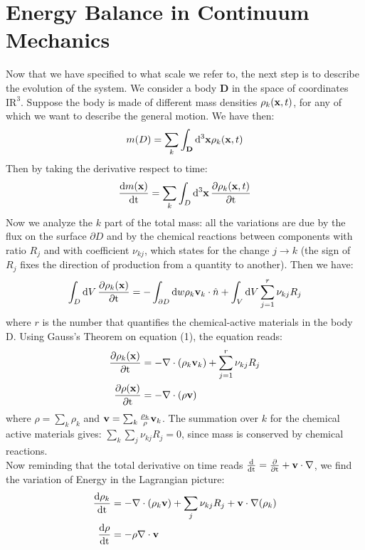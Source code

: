 \documentclass{article}
\newcommand*\diff{\mathop{}\!\mathrm{d}}
\newcommand*\Diff[1]{\mathop{}\!\mathrm{d^#1}}
\newcommand*\Tder[1]{\mathop{}\!\frac{\diff #1}{\diff \mathrm{t}}}
\newcommand*\tder[1]{\mathop{}\!\frac{\partial #1}{\partial \mathrm{t}} }
\begin{document}
\section{Energy Balance in Continuum Mechanics}
Now that we have specified to what scale we refer to, the next step is to describe the evolution of the system. We consider a body \textbf{D} in the space of coordinates $\mathrm{I\! R}^3$. Suppose the body is made of different mass densities $\rho_k(\x_v,t)$, for any of which we want to describe the general motion. We have then:
$$m(D) = \sum_k \int_\mathbf{D} \Diff3 \x_v \rho_k(\x_v,t)  $$
Then by taking the derivative respect to time:
$$ \Tder{m(\x_v) } = \sum_k \int_D \Diff3{\x_v} \tder{\rho_k(\x_v,t)}  $$
Now we analyze the $k$ part of the total mass: all the variations are due by the flux on the surface $\partial D $ and by the chemical reactions between components with ratio $R_j$ and with coefficient $\nu_{kj}$, which states for the change $j\xrightarrow{} k$ (the sign of $R_j$ fixes the direction of production from a quantity to another). Then we have:
\begin{equation}
\int_D \diff{V} \tder{\rho_k(\x_v)} = -\int_{\partial D} \diff{w} \rho_k {\v_v}_k \cdot \hat{n} + \int_V \diff{V} \sum_{j=1}^r \nu_{kj}R_j     
\end{equation}
where $r$ is the number that quantifies the chemical-active materials in the body D. Using Gauss's Theorem on equation (1), the equation reads:
\begin{equation*}
    \begin{aligned}
    \tder{\rho_k(\x_v)} &= - \mathbf{\nabla} \cdot  (\rho_k {\v_v}_k ) + \sum_{j=1}^r \nu_{kj}R_j  \\
    \tder{\rho(\x_v)} &= - \mathbf{\nabla} \cdot  (\rho {\v_v} )
    \end{aligned}    
\end{equation*}
where $\rho = \sum_k \rho_k$ and $\v_v = \sum_k \frac{\rho_k}{\rho} \v_v_k$. The summation over $k$ for the chemical active materials gives: $\sum_k \sum_j \nu_{kj}R_j  = 0$, since mass is conserved by chemical reactions.\\
Now reminding that the total derivative on time reads $\Tder{} = \tder{} + \v_v \cdot \nabla $, we find the variation of Energy in the Lagrangian picture:
\begin{equation}
    \begin{aligned}
    \Tder{\rho_k} &= -\nabla \cdot (\rho_k \v_v )+ \sum_j \nu_{kj}R_j +\v_v \cdot \nabla(\rho_k)\\
    \Tder{\rho} &= -\rho \nabla \cdot \v_v
    \end{aligned}
\end{equation}
\end{document}
